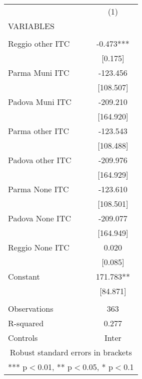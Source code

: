 \begin{tabular}{lc} \hline
 & (1) \\
VARIABLES &  \\ \hline
 &  \\
Reggio other ITC & -0.473*** \\
 & [0.175] \\
Parma Muni ITC & -123.456 \\
 & [108.507] \\
Padova Muni ITC & -209.210 \\
 & [164.920] \\
Parma other ITC & -123.543 \\
 & [108.488] \\
Padova other ITC & -209.976 \\
 & [164.929] \\
Parma None ITC & -123.610 \\
 & [108.501] \\
Padova None ITC & -209.077 \\
 & [164.949] \\
Reggio None ITC & 0.020 \\
 & [0.085] \\
Constant & 171.783** \\
 & [84.871] \\
 &  \\
Observations & 363 \\
R-squared & 0.277 \\
 Controls & Inter \\ \hline
\multicolumn{2}{c}{ Robust standard errors in brackets} \\
\multicolumn{2}{c}{ *** p$<$0.01, ** p$<$0.05, * p$<$0.1} \\
\end{tabular}
